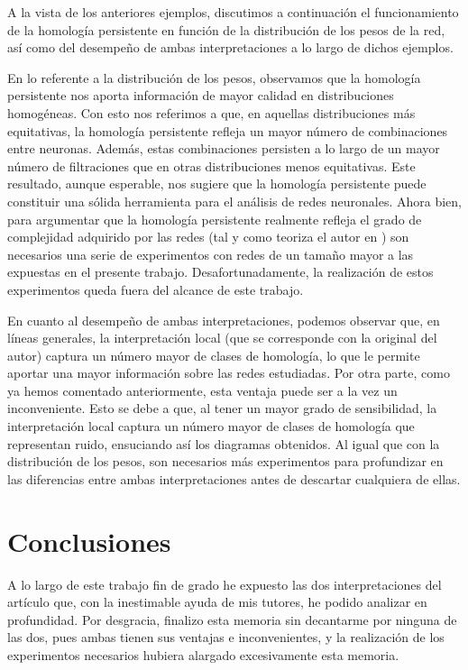\documentclass[12pt, a4paper, twoside]{book}
\numberwithin{equation}{section}
\theoremstyle{definition}
\theoremstyle{remark}
\theoremstyle{plain}
\begin{document}
	A la vista de los anteriores ejemplos, discutimos a continuación el 
	funcionamiento de la homología persistente en función de la 
	distribución de los pesos de la red, así como del desempeño de ambas 
	interpretaciones a lo largo de dichos ejemplos.

	En lo referente a la distribución de los pesos, observamos que la 
	homología persistente nos aporta información de mayor calidad en 
	distribuciones homogéneas. Con esto nos referimos a que, en aquellas 
	distribuciones más equitativas, la homología persistente refleja un 
	mayor número de combinaciones entre neuronas. Además, estas 
	combinaciones persisten a lo largo de un mayor número de filtraciones 
	que en otras distribuciones menos equitativas. Este resultado, aunque
	esperable, nos sugiere que la homología persistente puede constituir 
	una sólida herramienta para el análisis de redes neuronales. Ahora 
	bien, para argumentar que la homología persistente realmente refleja 
	el grado de complejidad adquirido por las redes (tal y como teoriza el 
	autor en \cite{Articulo-Watanabe}) son necesarios una serie de 
	experimentos con redes de un tamaño mayor a las expuestas en el 
	presente trabajo. Desafortunadamente, la realización de estos 
	experimentos queda fuera del alcance de este trabajo.

	En cuanto al desempeño de ambas interpretaciones, podemos observar 
	que, en líneas generales, la interpretación local (que se corresponde 
	con la original del autor) captura un número mayor de clases de 
	homología, lo que le permite aportar una mayor información sobre las 
	redes estudiadas. Por otra parte, como ya hemos comentado 
	anteriormente, esta ventaja puede ser a la vez un inconveniente. Esto 
	se debe a que, al tener un mayor grado de sensibilidad, la 
	interpretación local captura un número mayor de clases de homología 
	que representan ruido, ensuciando así los diagramas obtenidos. Al 
	igual que con la distribución de los pesos, son necesarios más 
	experimentos para profundizar en las diferencias entre ambas 
	interpretaciones antes de descartar cualquiera de ellas.

	\chapter{Conclusiones}
	A lo largo de este trabajo fin de grado he expuesto las dos 
	interpretaciones del artículo \cite{Articulo-Watanabe} que, con la 
	inestimable ayuda de mis tutores, he podido analizar en profundidad. 
	Por desgracia, finalizo esta memoria sin decantarme por ninguna de las 
	dos, pues ambas tienen sus ventajas e inconvenientes, y la realización 
	de los experimentos necesarios hubiera alargado excesivamente esta 
	memoria.
\end{document}
